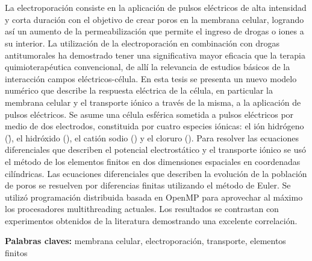 \chapter*{\runtitulo}

\noindent 

La electroporación consiste en la aplicación de pulsos eléctricos de alta intensidad y corta duración con el objetivo de crear poros en la membrana celular, logrando así un aumento de la permeabilización que permite el ingreso de drogas o iones a su interior. La utilización de la electroporación en combinación con drogas antitumorales ha demostrado tener una significativa mayor eficacia que la terapia quimioterapéutica convencional, de allí la relevancia de estudios básicos de la interacción campos eléctricos-célula. En esta tesis se presenta un nuevo modelo numérico que describe la respuesta eléctrica de la célula, en particular la membrana celular y el transporte iónico a través de la misma, a la aplicación de pulsos eléctricos. Se asume una célula esférica sometida a pulsos eléctricos por medio de dos electrodos, constituida por cuatro especies iónicas: el ión hidrógeno (\h), el hidróxido (\oh), el catión sodio (\na) y el cloruro (\cl). Para resolver las ecuaciones diferenciales que describen el potencial electrostático y el transporte iónico se usó el método de los elementos finitos en dos dimensiones espaciales en coordenadas cilíndricas. Las ecuaciones diferenciales que describen la evolución de la población de poros se resuelven por diferencias finitas utilizando el método de Euler. Se utilizó programación distribuida basada en OpenMP para aprovechar al máximo los procesadores multithreading actuales. Los resultados se contrastan con experimentos obtenidos de la literatura demostrando una excelente correlación.

\bigskip

\noindent\textbf{Palabras claves:} membrana celular, electroporación, transporte, elementos finitos